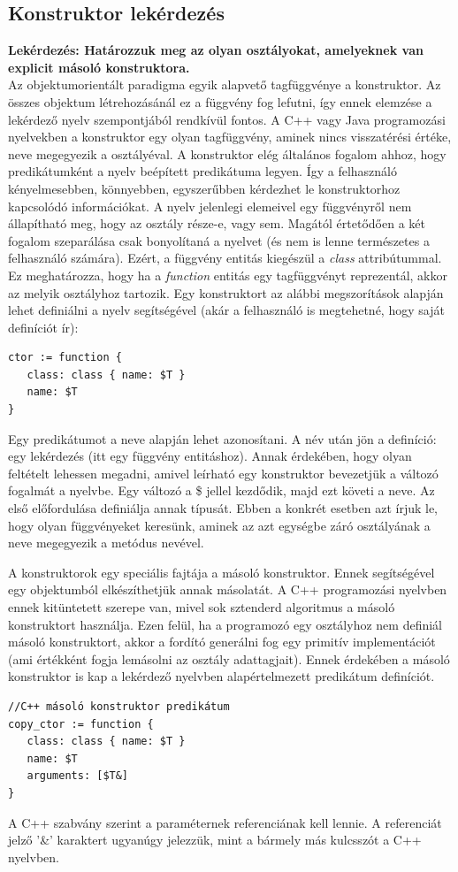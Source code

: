 \documentclass[a4paper,12pt]{report}
\begin{document}
\subsection{Konstruktor lekérdezés}
\textbf{Lekérdezés: Határozzuk meg az olyan osztályokat, amelyeknek van explicit másoló konstruktora.}
\\
Az objektumorientált paradigma egyik alapvető tagfüggvénye a konstruktor. Az összes objektum létrehozásánál ez a függvény fog lefutni, így ennek elemzése a lekérdező nyelv szempontjából rendkívül fontos. A C++ vagy Java programozási nyelvekben a konstruktor egy olyan tagfüggvény, aminek nincs visszatérési értéke, neve megegyezik a osztályéval. A konstruktor elég általános fogalom ahhoz, hogy predikátumként a nyelv beépített predikátuma legyen. Így a felhasználó kényelmesebben, könnyebben, egyszerűbben kérdezhet le konstruktorhoz kapcsolódó információkat. A nyelv jelenlegi elemeivel egy függvényről nem állapítható meg, hogy az osztály része-e, vagy sem. Magától értetődően a két fogalom szeparálása csak bonyolítaná a nyelvet (és nem is lenne természetes a felhasználó számára). Ezért, a függvény entitás kiegészül a \textit{class} attribútummal. Ez meghatározza, hogy ha a \textit{function} entitás egy tagfüggvényt reprezentál, akkor az melyik osztályhoz tartozik. Egy konstruktort az alábbi megszorítások alapján lehet definiálni a nyelv segítségével (akár a felhasználó is megtehetné, hogy saját definíciót ír):
\begin{verbatim}
ctor := function {
   class: class { name: $T }
   name: $T
}
\end{verbatim}
\par Egy predikátumot a neve alapján lehet azonosítani. A név után jön a definíció: egy lekérdezés (itt egy függvény entitáshoz). Annak érdekében, hogy olyan feltételt lehessen megadni, amivel leírható egy konstruktor bevezetjük a változó fogalmát a nyelvbe. Egy változó a \$ jellel kezdődik, majd ezt követi a neve. Az első előfordulása definiálja annak típusát. Ebben a konkrét esetben azt írjuk le, hogy olyan függvényeket keresünk, aminek az azt egységbe záró osztályának a neve megegyezik a metódus nevével.
\par A konstruktorok egy speciális fajtája a másoló konstruktor. Ennek segítségével egy objektumból elkészíthetjük annak másolatát. A C++ programozási nyelvben ennek kitüntetett szerepe van, mivel sok sztenderd algoritmus a másoló konstruktort használja. Ezen felül, ha a programozó egy osztályhoz nem definiál másoló konstruktort, akkor a fordító generálni fog egy primitív implementációt (ami értékként fogja lemásolni az osztály adattagjait). Ennek érdekében a másoló konstruktor is kap a lekérdező nyelvben alapértelmezett predikátum definíciót.
\begin{verbatim}
//C++ másoló konstruktor predikátum
copy_ctor := function {
   class: class { name: $T }
   name: $T
   arguments: [$T&]
}
\end{verbatim}
\par A C++ szabvány szerint a paraméternek referenciának kell lennie. A referenciát jelző '\&' karaktert ugyanúgy jelezzük, mint a bármely más kulcsszót a C++ nyelvben. 
\end{document}
